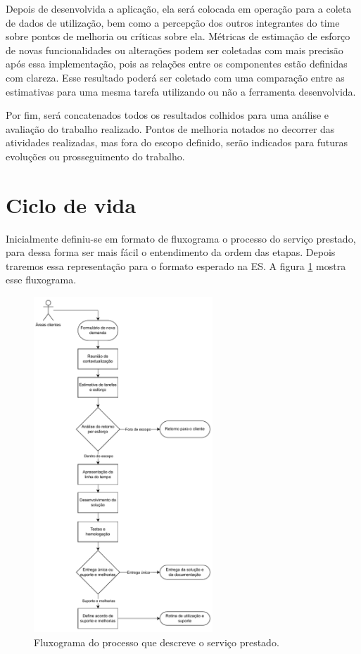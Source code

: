 Depois de desenvolvida a aplicação, ela será colocada em operação para a coleta 
de dados de utilização, bem como a percepção dos outros integrantes do time sobre 
pontos de melhoria ou críticas sobre ela. Métricas de estimação de esforço de novas 
funcionalidades ou alterações podem ser coletadas com mais precisão após essa 
implementação, pois as relações entre os componentes estão definidas com 
clareza. Esse resultado poderá ser coletado com uma comparação entre as 
estimativas para uma mesma tarefa utilizando ou não a ferramenta desenvolvida. 

Por fim, será concatenados todos os resultados colhidos para uma análise e 
avaliação do trabalho realizado. Pontos de melhoria notados no decorrer das 
atividades realizadas, mas fora do escopo definido, serão indicados para futuras 
evoluções ou prosseguimento do trabalho. 

	

	\section{{\color{blue}Ciclo de vida}}

	Inicialmente definiu-se em formato de fluxograma o processo do serviço prestado, para dessa forma ser 
	mais fácil o entendimento da ordem das etapas. Depois traremos essa representação para o formato esperado
	na ES. A figura \ref{fig:metodologia:processFlow} mostra esse fluxograma.
	
	\begin{figure}[H]
		\centering
		\includegraphics[width=0.6\textwidth]{./figuras/processFlow.pdf}
		\caption{Fluxograma do processo que descreve o serviço prestado.}
		\label{fig:metodologia:processFlow}
	\end{figure}
	
